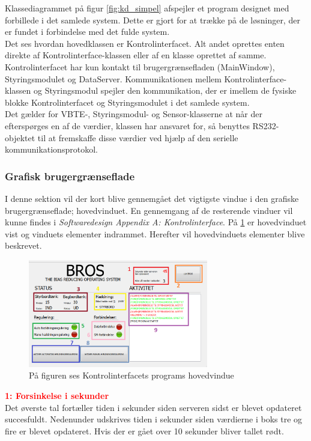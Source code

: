 Klassediagrammet på figur \ref{fig:kd_simpel} afspejler et program designet med forbillede i det samlede system. Dette er gjort for at trække på de løsninger, der er fundet i forbindelse med det fulde system. \\
Det ses hvordan hovedklassen er Kontrolinterfacet. Alt andet oprettes enten direkte af Kontrolinterface-klassen eller af en klasse oprettet af samme. Kontrolinterfacet har kun kontakt til brugergrænsefladen (MainWindow), Styringsmodulet og DataServer. Kommunikationen mellem Kontrolinterface-klassen og Styringsmodul spejler den kommunikation, der er imellem de fysiske blokke Kontrolinterfacet og Styringsmodulet i det samlede system.\\

Det gælder for VBTE-, Styringsmodul- og Sensor-klasserne at når der efterspørges en af de værdier, klassen har ansvaret for, så benyttes RS232-objektet til at fremskaffe disse værdier ved hjælp af den serielle kommunikationsprotokol. 


\subsubsection{Grafisk brugergrænseflade}
I denne sektion vil der kort blive gennemgået det vigtigste vindue i den grafiske brugergrænseflade; hovedvinduet. En gennemgang af de resterende vinduer vil kunne findes i \textit{Softwaredesign Appendix A: Kontrolinterface}.
På \ref{fig:hovedvindue} er hovedvinduet vist og vinduets elementer indrammet. Herefter vil hovedvinduets elementer blive beskrevet.

\begin{figure}[H]
\centering
\includegraphics[width=0.7\textwidth]{billeder/KI/hovedvindue}
\caption{På figuren ses Kontrolinterfacets programs hovedvindue}
\label{fig:hovedvindue}
\end{figure}

\textcolor{red}{\textbf{1: Forsinkelse i sekunder}}\\
Det øverste tal fortæller tiden i sekunder siden serveren sidst er blevet opdateret succesfuldt.
Nedenunder udskrives tiden i sekunder siden værdierne i boks tre og fire er blevet opdateret. Hvis der er gået over 10 sekunder bliver tallet rødt.

